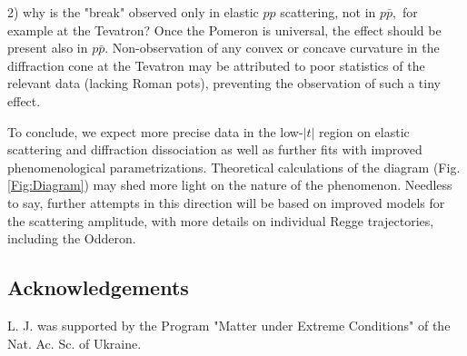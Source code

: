 \documentclass[aps,prd,superscriptaddress,showpacs,preprintnumbers]{revtex4}
\begin{document}
2) why is the "break" observed only in elastic $pp$ scattering, not in $p\bar p,$ for example at the Tevatron? Once the Pomeron is universal, the effect should be present also in $p\bar p$. Non-observation of any convex or concave curvature in the diffraction cone at the Tevatron may be attributed to poor statistics of the relevant data (lacking Roman pots), preventing the observation of such a tiny effect.

To conclude, we expect more precise data in the low-$|t|$ region on elastic scattering and diffraction dissociation as well as further fits with improved phenomenological parametrizations. Theoretical calculations of the diagram (Fig. \ref{Fig:Diagram}) may shed more light on the nature of the phenomenon. Needless to say, further attempts in this direction will be based on improved models for the scattering amplitude, with more details on individual Regge trajectories, including the Odderon. 

\subsection*{Acknowledgements}
L. J. was supported by the Program "Matter under Extreme Conditions" of the Nat. Ac. Sc. of Ukraine. 

    

\end{document}
